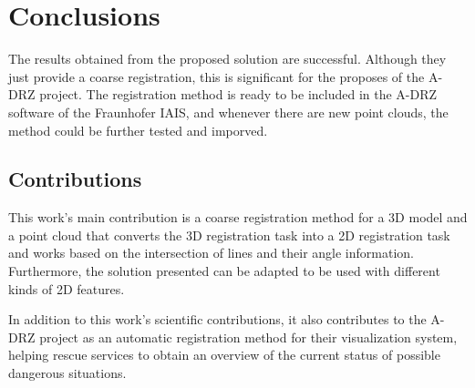 

    \chapter{Conclusions}

    The results obtained from the proposed solution are successful. 
    Although they just provide a coarse registration, this is significant for the proposes of the A-DRZ project.
    The registration method is ready to be included in the A-DRZ software of the Fraunhofer IAIS,
    and whenever there are new point clouds, the method could be further tested and imporved.

    \section{Contributions}
        This work’s main contribution is a coarse registration method for a 3D model and a point cloud 
        that converts the 3D registration task into a 2D registration task and works based on the intersection of lines and their angle information. 
        Furthermore, the solution presented can be adapted to be used with different kinds of 2D features.
    
        In addition to this work’s scientific contributions, 
        it also contributes to the A-DRZ project as an automatic registration method for their visualization system, 
        helping rescue services to obtain an overview of the current status of possible dangerous situations.
    


